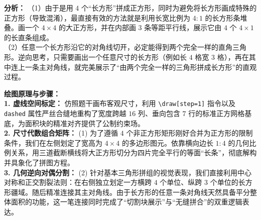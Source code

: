 \textbf{分析：}
（1）由于是用 $4$ 个“长方形”拼成正方形，同时为避免将长方形画成特殊的正方形（导致混淆），最直接有效的方法就是利用长宽比例为 $4:1$ 的长方形条堆叠。画一个 $4 \times 4$ 的大正方形，并在内部画 $3$ 条等距平行线，展示它由 $4$ 个 $4\times 1$ 的长直条组成。\\
（2）任意一个长方形沿它的对角线切开，必定能得到两个完全一样的直角三角形。逆向思考，只需要画出一个任意尺寸的长方形（例如长 $4$ 格宽 $3$ 格），再在其中连上一条主对角线，就完美展示了“由两个完全一样的三角形拼成长方形”的直观过程。

\vspace{0.6cm}
\begin{center}
\end{center}

\vspace{0.4cm}
{\small\color{blue!70!black}
\textbf{绘图原理与步骤：}\\
\textbf{1. 虚线空间标定：} 仿照题干画布客观尺寸，利用 \texttt{\textbackslash draw[step=1]} 指令以及 \texttt{dashed} 属性严丝合缝地重构了宽度跨越 $16$ 列、垂向包含 $7$ 行的标准正方网格基底，为面积块的精准对齐提供了公制约束场。\\
\textbf{2. 尺寸代数组合矩阵：} (1) 为了遵循 $4$ 个非正方形矩形刚好合并为正方形的限制条件，我们在左侧划定了宽高为 $4 \times 4$ 的多边形图元。依靠横向边长 $1:4$ 的几何比例关系，用三道截断横线将大正方形切分为四片完全平行的等面“长条”，彻底解构并具象化了拼图方程。\\
\textbf{3. 几何逆向对偶分割：} (2) 针对基本三角形拼组的视觉表现，我们直接利用中心对称和正交割裂法则：在右侧独立划定一方横跨 $4$ 个单位、纵跨 $3$ 个单位的长方形疆域。随后精准连接其主对角线。由于长方形的任意一条对角线天然具备平分整体面积的功能，这一笔连接同时完成了“切割块展示”与“无缝拼合”的双重逻辑表达。
}

\newpage
